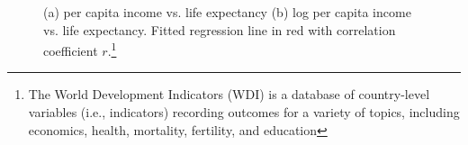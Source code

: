 \documentclass[10pt,handout]{beamer}\usepackage[]{graphicx}\usepackage[]{color}
\newenvironment{knitrout}{}{} %
\begin{document}
\begin{frame}
	
\begin{knitrout}\tiny
{}\color{fgcolor}\begin{figure}

{\centering {}

}

\caption{(a) per capita income vs. life expectancy (b) log per capita income vs. life expectancy. Fitted regression line in red with correlation coefficient $r$.\footnote{\tiny{The World Development Indicators (WDI) is a database of country-level variables (i.e., indicators) recording outcomes for a variety of topics, including economics, health, mortality, fertility, and education}}}\label{fig:004-nyt}
\end{figure}


\end{knitrout}
	
\end{frame}
\end{document}
